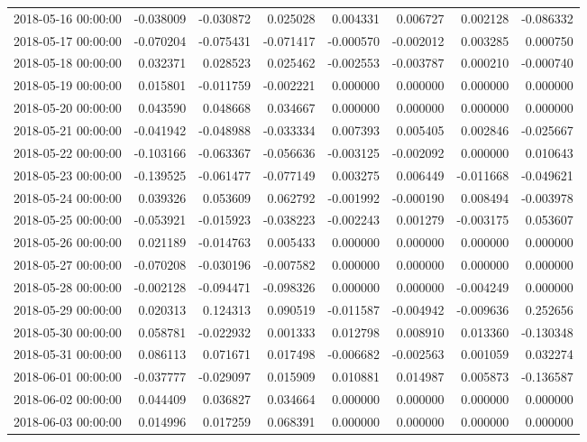 \begin{tabular}{lrrrrrrr}
2018-05-16 00:00:00 & -0.038009 & -0.030872 & 0.025028 & 0.004331 & 0.006727 & 0.002128 & -0.086332 \\
2018-05-17 00:00:00 & -0.070204 & -0.075431 & -0.071417 & -0.000570 & -0.002012 & 0.003285 & 0.000750 \\
2018-05-18 00:00:00 & 0.032371 & 0.028523 & 0.025462 & -0.002553 & -0.003787 & 0.000210 & -0.000740 \\
2018-05-19 00:00:00 & 0.015801 & -0.011759 & -0.002221 & 0.000000 & 0.000000 & 0.000000 & 0.000000 \\
2018-05-20 00:00:00 & 0.043590 & 0.048668 & 0.034667 & 0.000000 & 0.000000 & 0.000000 & 0.000000 \\
2018-05-21 00:00:00 & -0.041942 & -0.048988 & -0.033334 & 0.007393 & 0.005405 & 0.002846 & -0.025667 \\
2018-05-22 00:00:00 & -0.103166 & -0.063367 & -0.056636 & -0.003125 & -0.002092 & 0.000000 & 0.010643 \\
2018-05-23 00:00:00 & -0.139525 & -0.061477 & -0.077149 & 0.003275 & 0.006449 & -0.011668 & -0.049621 \\
2018-05-24 00:00:00 & 0.039326 & 0.053609 & 0.062792 & -0.001992 & -0.000190 & 0.008494 & -0.003978 \\
2018-05-25 00:00:00 & -0.053921 & -0.015923 & -0.038223 & -0.002243 & 0.001279 & -0.003175 & 0.053607 \\
2018-05-26 00:00:00 & 0.021189 & -0.014763 & 0.005433 & 0.000000 & 0.000000 & 0.000000 & 0.000000 \\
2018-05-27 00:00:00 & -0.070208 & -0.030196 & -0.007582 & 0.000000 & 0.000000 & 0.000000 & 0.000000 \\
2018-05-28 00:00:00 & -0.002128 & -0.094471 & -0.098326 & 0.000000 & 0.000000 & -0.004249 & 0.000000 \\
2018-05-29 00:00:00 & 0.020313 & 0.124313 & 0.090519 & -0.011587 & -0.004942 & -0.009636 & 0.252656 \\
2018-05-30 00:00:00 & 0.058781 & -0.022932 & 0.001333 & 0.012798 & 0.008910 & 0.013360 & -0.130348 \\
2018-05-31 00:00:00 & 0.086113 & 0.071671 & 0.017498 & -0.006682 & -0.002563 & 0.001059 & 0.032274 \\
2018-06-01 00:00:00 & -0.037777 & -0.029097 & 0.015909 & 0.010881 & 0.014987 & 0.005873 & -0.136587 \\
2018-06-02 00:00:00 & 0.044409 & 0.036827 & 0.034664 & 0.000000 & 0.000000 & 0.000000 & 0.000000 \\
2018-06-03 00:00:00 & 0.014996 & 0.017259 & 0.068391 & 0.000000 & 0.000000 & 0.000000 & 0.000000 \\

\end{tabular}
